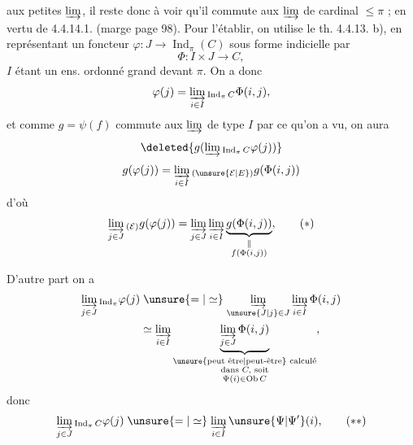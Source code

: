aux petites $\varinjlim$, il reste donc à voir qu'il commute aux $\varinjlim$ de cardinal $\leq\pi$ ; en vertu de 4.4.14.1. (marge page 98). Pour l'établir, on utilise le th. 4.4.13. b), en représentant un foncteur $\varphi:J\longrightarrow\operatorname{Ind}_\pi(C)$  sous forme indicielle par
\[
\Phi:I\times J\longrightarrow C,\tag*{(4.4.16.6)}
\]
$I$ étant un ens. ordonné grand devant $\pi$. On a donc
\[
\varphi(j)=\varinjlim_{i\in I}{}_{\operatorname{Ind}_\pi C}\Phi(i,j),
\]
et comme $g=\psi(f)$ commute aux $\varinjlim$ de type $I$ par ce qu'on a vu, on aura
\[
\deleted{g(\varinjlim{}_{\operatorname{Ind}_\pi C}\varphi(j))}
\]
\[
g(\varphi(j))=\varinjlim_{i\in I}{}_{(\unsure{\mathcal E|E})}g(\Phi(i,j))
\]
d'où
\[
\varinjlim_{j\in J}{}_{(\mathcal E)}g(\varphi(j))=\varinjlim_{j\in J}\varinjlim_{i\in I}
\underbrace{g(\Phi(i,j))}_{\substack{\Vert\\ f(\Phi(i,j))}},\tag*{(\(\ast\))}
\]

D'autre part on a
\[
\begin{aligned}
\varinjlim_{j\in J}{}_{\operatorname{Ind}_\pi}\varphi(j)
 &\mathrel{\unsure{=|\simeq}}\varinjlim_{\unsure{J|j}\in J}\varinjlim_{i\in I}\Phi(i,j)\\
 &\simeq\varinjlim_{i\in I}\underbrace{\varinjlim_{j\in J}\Phi(i,j)}_{\substack{\text{\unsure{peut être|peut-être} calculé}\\\text{dans }C,\text{ soit}\\\Psi(i)\in\operatorname{Ob} C}},
\end{aligned}
\]
donc
\[
\varinjlim_{j\in J}{}_{\operatorname{Ind}_\pi C}\varphi(j)\mathrel{\unsure{=|\simeq}}\varinjlim_{i\in I}\unsure{\Psi|\Psi'}(i),\tag*{(\(\ast\ast\))}
\]
